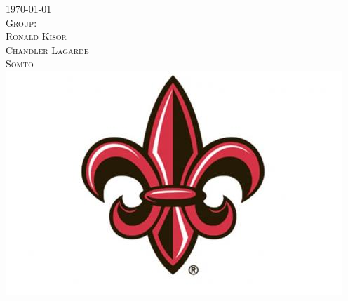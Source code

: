 \documentclass[12pt]{article}
\begin{document}
\begin{titlepage}


{\textsc{\large \today}}\\[0.5cm] %



\textsc{\large Group:}\\[0.1cm]
\textsc{Ronald Kisor}\\
\textsc{Chandler Lagarde}\\
\textsc{Somto}
\\[0.5cm]


\includegraphics[width=5in]{UL_logo.jpg}\\[1cm] %
 

\vfill %

\end{titlepage}
\end{document}
